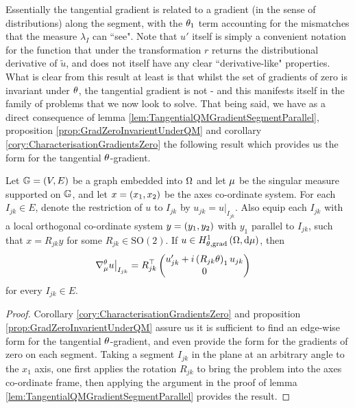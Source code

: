 Essentially the tangential gradient is related to a gradient (in the sense of distributions) along the segment, with the $\theta_1$ term accounting for the mismatches that the measure $\lambda_I$ can ``see".
Note that $u'$ itself is simply a convenient notation for the function that under the transformation $r$ returns the distributional derivative of $\widetilde{u}$, and does not itself have any clear ``derivative-like" properties.
What is clear from this result at least is that whilst the set of gradients of zero is invariant under $\theta$, the tangential gradient is not - and this manifests itself in the family of problems that we now look to solve.
That being said, we have as a direct consequence of lemma \ref{lem:TangentialQMGradientSegmentParallel}, proposition \ref{prop:GradZeroInvarientUnderQM} and corollary \ref{cory:CharacterisationGradientsZero} the following result which provides us the form for the tangential $\theta$-gradient.

\begin{cory} \label{cory:TangentialQMGradientGraphs}
	Let $\mathbb{G}=(V,E)$ be a graph embedded into $\Omega$ and let $\mu$ be the singular measure supported on $\mathbb{G}$, and let $x=\left( x_1,x_2 \right)$ be the axes co-ordinate system.
	For each $I_{jk}\in E$, denote the restriction of $u$ to $I_{jk}$ by $u_{jk} = u\vert_{I_{jk}}$.
	Also equip each $I_{jk}$ with a local orthogonal co-ordinate system $y=\left( y_1,y_2 \right)$ with $y_1$ parallel to $I_{jk}$, such that $x = R_{jk}y$ for some $R_{jk}\in\mathrm{SO}(2)$.
	If $u\in H^1_{\theta, \mathrm{grad}}\left( \Omega, \mathrm{d}\mu \right)$, then
	\begin{align*}
		\nabla_\mu^\theta u \big\vert_{I_{jk}} &= R_{jk}^\top \begin{pmatrix} u_{jk}' + i\left( R_{jk}\theta \right)_1 u_{jk} \\ 0 \end{pmatrix}
	\end{align*}
	for every $I_{jk}\in E$.
\end{cory}
\begin{proof}
	Corollary \ref{cory:CharacterisationGradientsZero} and proposition \ref{prop:GradZeroInvarientUnderQM} assure us it is sufficient to find an edge-wise form for the tangential $\theta$-gradient, and even provide the form for the gradients of zero on each segment.
	Taking a segment $I_{jk}$ in the plane at an arbitrary angle to the $x_1$ axis, one first applies the rotation $R_{jk}$ to bring the problem into the axes co-ordinate frame, then applying the argument in the proof of lemma \ref{lem:TangentialQMGradientSegmentParallel} provides the result.
\end{proof}

